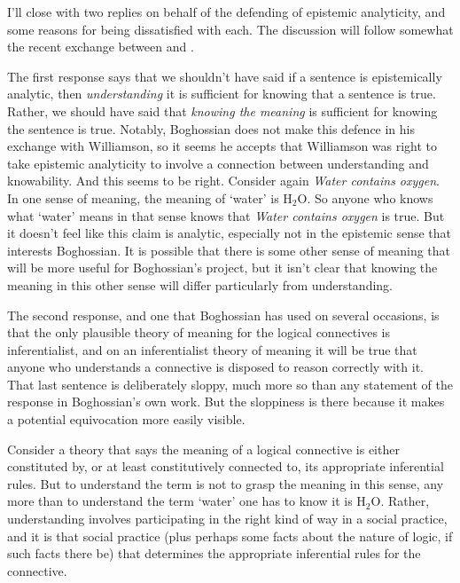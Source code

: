 I'll close with two replies on behalf of the defending of epistemic analyticity, and some reasons for being dissatisfied with each. The discussion will follow somewhat the recent exchange between  \citet{Boghossian2011-BOGWOT} and  \citet{Williamson2011-WILRTB-3}.

The first response says that we shouldn't have said if a sentence is epistemically analytic, then \emph{understanding} it is sufficient for knowing that a sentence is true. Rather, we should have said that \emph{knowing the meaning} is sufficient for knowing the sentence is true. Notably, Boghossian does not make this defence in his exchange with Williamson, so it seems he accepts that Williamson was right to take epistemic analyticity to involve a connection between understanding and knowability. And this seems to be right. Consider again \emph{Water contains oxygen}. In one sense of meaning, the meaning of `water' is H$_2$O. So anyone who knows what `water' means in that sense knows that \emph{Water contains oxygen} is true. But it doesn't feel like this claim is analytic, especially not in the epistemic sense that interests Boghossian. It is possible that there is some other sense of meaning that will be more useful for Boghossian's project, but it isn't clear that knowing the meaning in this other sense will differ particularly from understanding.

The second response, and one that Boghossian has used on several occasions, is that the only plausible theory of meaning for the logical connectives is inferentialist, and on an inferentialist theory of meaning it will be true that anyone who understands a connective is disposed to reason correctly with it. That last sentence is deliberately sloppy, much more so than any statement of the response in Boghossian's own work. But the sloppiness is there because it makes a potential equivocation more easily visible.

Consider a theory that says the meaning of a logical connective is either constituted by, or at least constitutively connected to, its appropriate inferential rules. But to understand the term is not to grasp the meaning in this sense, any more than to understand the term `water' one has to know it is H$_2$O. Rather, understanding involves participating in the right kind of way in a social practice, and it is that social practice (plus perhaps some facts about the nature of logic, if such facts there be) that determines the appropriate inferential rules for the connective. 


